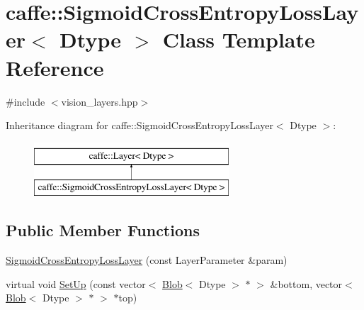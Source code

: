 \hypertarget{classcaffe_1_1_sigmoid_cross_entropy_loss_layer}{\section{caffe\+:\+:Sigmoid\+Cross\+Entropy\+Loss\+Layer$<$ Dtype $>$ Class Template Reference}
\label{classcaffe_1_1_sigmoid_cross_entropy_loss_layer}
}


{\ttfamily \#include $<$vision\+\_\+layers.\+hpp$>$}

Inheritance diagram for caffe\+:\+:Sigmoid\+Cross\+Entropy\+Loss\+Layer$<$ Dtype $>$\+:\begin{figure}[H]
\begin{center}
\leavevmode
\includegraphics[height=2.000000cm]{classcaffe_1_1_sigmoid_cross_entropy_loss_layer}
\end{center}
\end{figure}
\subsection*{Public Member Functions}
\begin{DoxyCompactItemize}
\item 
\hyperlink{classcaffe_1_1_sigmoid_cross_entropy_loss_layer_a3b4478b3d5c5130de685b240b274c06c}{Sigmoid\+Cross\+Entropy\+Loss\+Layer} (const Layer\+Parameter \&param)
\item 
virtual void \hyperlink{classcaffe_1_1_sigmoid_cross_entropy_loss_layer_ab45ec795cdd1c1a31c767aeaf2ed2b91}{Set\+Up} (const vector$<$ \hyperlink{classcaffe_1_1_blob}{Blob}$<$ Dtype $>$ $\ast$ $>$ \&bottom, vector$<$ \hyperlink{classcaffe_1_1_blob}{Blob}$<$ Dtype $>$ $\ast$ $>$ $\ast$top)
\end{DoxyCompactItemize}
